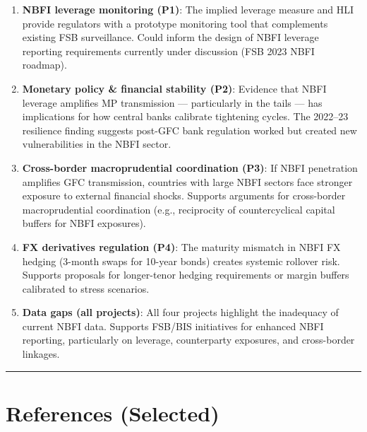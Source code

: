 \documentclass[11pt,a4paper]{article}
\begin{document}
\begin{enumerate}
\item \textbf{NBFI leverage monitoring (P1)}: The implied leverage measure and HLI provide regulators with a prototype monitoring tool that complements existing FSB surveillance. Could inform the design of NBFI leverage reporting requirements currently under discussion (FSB 2023 NBFI roadmap).

\item \textbf{Monetary policy \& financial stability (P2)}: Evidence that NBFI leverage amplifies MP transmission --- particularly in the tails --- has implications for how central banks calibrate tightening cycles. The 2022--23 resilience finding suggests post-GFC bank regulation worked but created new vulnerabilities in the NBFI sector.

\item \textbf{Cross-border macroprudential coordination (P3)}: If NBFI penetration amplifies GFC transmission, countries with large NBFI sectors face stronger exposure to external financial shocks. Supports arguments for cross-border macroprudential coordination (e.g., reciprocity of countercyclical capital buffers for NBFI exposures).

\item \textbf{FX derivatives regulation (P4)}: The maturity mismatch in NBFI FX hedging (3-month swaps for 10-year bonds) creates systemic rollover risk. Supports proposals for longer-tenor hedging requirements or margin buffers calibrated to stress scenarios.

\item \textbf{Data gaps (all projects)}: All four projects highlight the inadequacy of current NBFI data. Supports FSB/BIS initiatives for enhanced NBFI reporting, particularly on leverage, counterparty exposures, and cross-border linkages.

\end{enumerate}

\bigskip\noindent\rule{\textwidth}{0.4pt}\bigskip


\section{References (Selected)}
\end{document}
